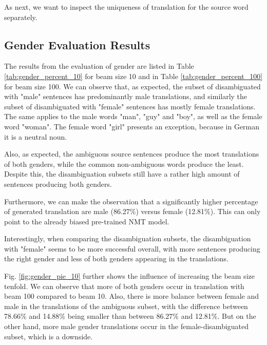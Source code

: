 As next, we want to inspect the uniqueness of translation for the source word separately.

\subsection{Gender Evaluation Results}
\label{ch:Base_Experiment:Results:Gender}

The results from the evaluation of gender are listed in Table \ref{tab:gender_percent_10} for beam size 10 and in Table \ref{tab:gender_percent_100} for beam size 100. We can observe that, as expected, the subset of disambiguated with "male" sentences has predominantly male translations, and similarly the subset of disambiguated with "female" sentences has mostly female translations. The same applies to the male words "man", "guy" and "boy", as well as the female word "woman". The female word "girl" presents an exception, because in German it is a neutral noun.

Also, as expected, the ambiguous source sentences produce the most translations of both genders, while the common non-ambiguous words produce the least. Despite this, the disambiguation subsets still have a rather high amount of sentences producing both genders. 

Furthermore, we can make the observation that a significantly higher percentage of generated translation are male (86.27\%) versus female (12.81\%). This can only point to the already biased pre-trained NMT model.

Interestingly, when comparing the disambiguation subsets, the disambiguation with "female" seems to be more successful overall, with more sentences producing the right gender and less of both genders appearing in the translations.

Fig. \ref{fig:gender_pie_10} further shows the influence of increasing the beam size tenfold. We can observe that more of both genders occur in translation with beam 100 compared to beam 10. Also, there is more balance between female and male in the translations of the ambiguous subset, with the difference between 78.66\% and 14.88\% being smaller than between 86.27\% and 12.81\%. But on the other hand, more male gender translations occur in the female-disambiguated subset, which is a downside.

